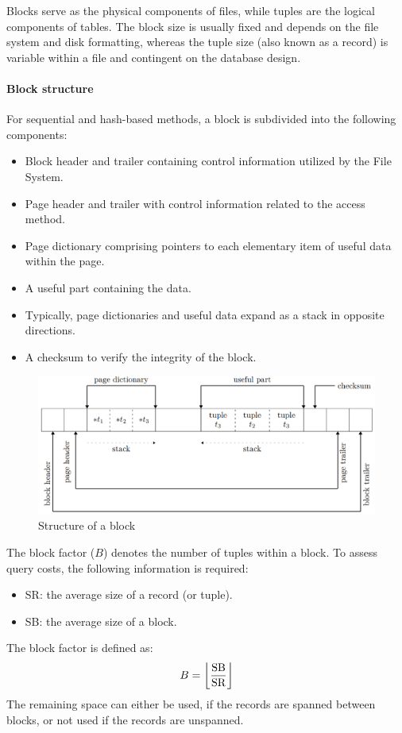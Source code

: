 Blocks serve as the physical components of files, while tuples are the logical components of tables.
The block size is usually fixed and depends on the file system and disk formatting, whereas the tuple size (also known as a record) is variable within a file and contingent on the database design.

\paragraph*{Block structure} 
For sequential and hash-based methods, a block is subdivided into the following components:
\begin{itemize}
    \item Block header and trailer containing control information utilized by the File System.
    \item Page header and trailer with control information related to the access method. 
    \item Page dictionary comprising pointers to each elementary item of useful data within the page.
    \item A useful part containing the data. 
    \item Typically, page dictionaries and useful data expand as a stack in opposite directions.
    \item A checksum to verify the integrity of the block.
\end{itemize}
\begin{figure}[H]
    \centering
    \includegraphics[width=0.75\linewidth]{images/block.png}
    \caption{Structure of a block}
\end{figure} 
The block factor ($B$) denotes the number of tuples within a block. 
To assess query costs, the following information is required:
\begin{itemize}
    \item SR: the average size of a record (or tuple). 
    \item SB: the average size of a block. 
\end{itemize}
The block factor is defined as:
\[B=\left\lfloor \dfrac{\textnormal{SB}}{\textnormal{SR}} \right\rfloor \]
The remaining space can either be used, if the records are spanned between blocks, or not used if the records are unspanned.

